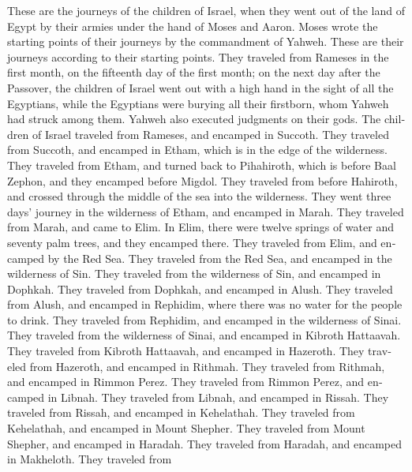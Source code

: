 \begin{paracol}{2}
\begin{otherlanguage}{english}
 These are the journeys of the children of Israel, when
they went out of the land of Egypt by their armies under the hand of
Moses and Aaron.  Moses wrote the starting points of their
journeys by the commandment of Yahweh. These are their journeys
according to their starting points.  They traveled from
Rameses in the first month, on the fifteenth day of the first month; on
the next day after the Passover, the children of Israel went out with a
high hand in the sight of all the Egyptians,  while the
Egyptians were burying all their firstborn, whom Yahweh had struck among
them. Yahweh also executed judgments on their gods.  The
children of Israel traveled from Rameses, and encamped in Succoth.
 They traveled from Succoth, and encamped in Etham, which
is in the edge of the wilderness.  They traveled from
Etham, and turned back to Pihahiroth, which is before Baal Zephon, and
they encamped before Migdol.  They traveled from before
Hahiroth, and crossed through the middle of the sea into the wilderness.
They went three days' journey in the wilderness of Etham, and encamped
in Marah.  They traveled from Marah, and came to Elim. In
Elim, there were twelve springs of water and seventy palm trees, and
they encamped there.  They traveled from Elim, and
encamped by the Red Sea.  They traveled from the Red Sea,
and encamped in the wilderness of Sin.  They traveled
from the wilderness of Sin, and encamped in Dophkah. 
They traveled from Dophkah, and encamped in Alush.  They
traveled from Alush, and encamped in Rephidim, where there was no water
for the people to drink.  They traveled from Rephidim,
and encamped in the wilderness of Sinai.  They traveled
from the wilderness of Sinai, and encamped in Kibroth Hattaavah.
 They traveled from Kibroth Hattaavah, and encamped in
Hazeroth.  They traveled from Hazeroth, and encamped in
Rithmah.  They traveled from Rithmah, and encamped in
Rimmon Perez.  They traveled from Rimmon Perez, and
encamped in Libnah.  They traveled from Libnah, and
encamped in Rissah.  They traveled from Rissah, and
encamped in Kehelathah.  They traveled from Kehelathah,
and encamped in Mount Shepher.  They traveled from Mount
Shepher, and encamped in Haradah.  They traveled from
Haradah, and encamped in Makheloth.  They traveled from

\end{otherlanguage}
\end{paracol}
